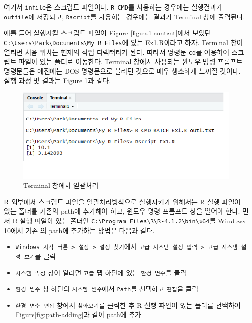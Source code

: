 \documentclass[
]{book}
\begin{document}
여기서 \texttt{infile}은 스크립트 파일이다. \texttt{R\ CMD}를 사용하는 경우에는 실행결과가
\texttt{outfile}에 저장되고, \texttt{Rscript}를 사용하는 경우에는 결과가 Terminal 창에
출력된다.

예를 들어 실행시킬 스크립트 파일이 Figure \ref{fig:ex1-content}에서
보았던 \texttt{C:\textbackslash{}Users\textbackslash{}Park\textbackslash{}Documents\textbackslash{}My\ R\ Files}에 있는 Ex1.R이라고 하자.
Terminal 창이 열리면 처음 위치는 현재의 작업 디렉터리가 된다. 따라서
명령문 \texttt{cd}를 이용하여 스크립트 파일이 있는 폴더로 이동한다. Terminal
창에서 사용되는 윈도우 명령 프롬프트 명령문들은 예전에는 DOS 명령문으로
불리던 것으로 매우 생소하게 느껴질 것이다. 실행 과정 및 결과는 Figure
\ref{fig:terminal-batch}과 같다.

\begin{figure}
\includegraphics[width=7.53in]{Figure/terminal_batch} \caption{Terminal 창에서 일괄처리}\label{fig:terminal-batch}
\end{figure}

R 외부에서 스크립트 파일을 일괄처리방식으로 실행시키기 위해서는 R 실행
파일이 있는 폴더를 기존의 path에 추가해야 하고, 윈도우 명령 프롬프트
창을 열어야 한다. 먼저 R 실행 파일이 있는 폴더인
\texttt{C:\textbackslash{}Program\ Files\textbackslash{}R\textbackslash{}R-4.1.2\textbackslash{}bin\textbackslash{}x64}를 Windows 10에서 기존 의 path에
추가하는 방법은 다음과 같다.

\begin{itemize}
\item
  \texttt{Windows\ 시작\ 버튼\ \textgreater{}\ 설정\ \textgreater{}\ 설정\ 찾기}에서
  \texttt{고급\ 시스템\ 설정\ 입력\ \textgreater{}\ \textquotesingle{}고급\ 시스템\ 설정\ 보기}를 클릭
\item
  \texttt{시스템\ 속성} 창이 열리면 \texttt{고급} 탭 하단에 있는 \texttt{환경\ 변수}를 클릭
\item
  \texttt{환경\ 변수} 창 하단의 \texttt{시스템\ 변수}에서 \texttt{Path}를 선택하고 \texttt{편집}을
  클릭
\item
  \texttt{환경\ 변수\ 편집} 창에서 \texttt{찾아보기}를 클릭한 후 R 실행 파일이 있는
  폴더를 선택하여 Figure\ref{fig:path-adding}과 같이 path에 추가
\end{itemize}
\end{document}
